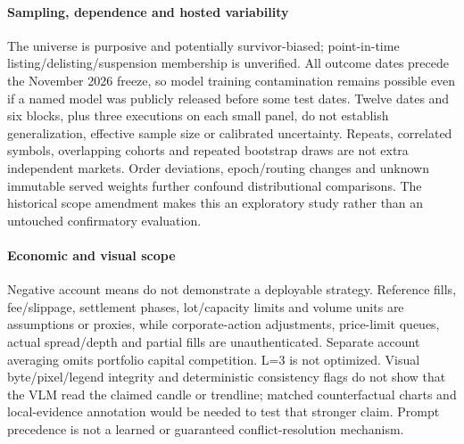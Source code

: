 \paragraph{Sampling, dependence and hosted variability}
The universe is purposive and potentially survivor-biased; point-in-time listing/delisting/suspension membership is unverified. All outcome dates precede the November 2026 freeze, so model training contamination remains possible even if a named model was publicly released before some test dates. Twelve dates and six blocks, plus three executions on each small panel, do not establish generalization, effective sample size or calibrated uncertainty. Repeats, correlated symbols, overlapping cohorts and repeated bootstrap draws are not extra independent markets. Order deviations, epoch/routing changes and unknown immutable served weights further confound distributional comparisons. The historical scope amendment makes this an exploratory study rather than an untouched confirmatory evaluation.

\paragraph{Economic and visual scope}
Negative account means do not demonstrate a deployable strategy. Reference fills, fee/slippage, settlement phases, lot/capacity limits and volume units are assumptions or proxies, while corporate-action adjustments, price-limit queues, actual spread/depth and partial fills are unauthenticated. Separate account averaging omits portfolio capital competition. L=3 is not optimized. Visual byte/pixel/legend integrity and deterministic consistency flags do not show that the VLM read the claimed candle or trendline; matched counterfactual charts and local-evidence annotation would be needed to test that stronger claim. Prompt precedence is not a learned or guaranteed conflict-resolution mechanism.

